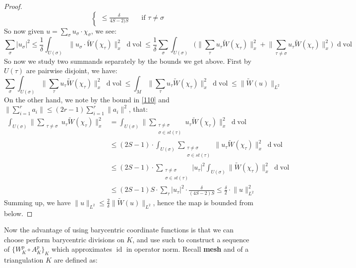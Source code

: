 \documentclass[11pt]{report}
\theoremstyle{definition}
\theoremstyle{plain}
\DeclareMathOperator{\id}{id}
\DeclareMathOperator{\vol}{vol}
\newcommand{\norm}[1]{\lVert #1 \rVert}
\renewcommand{\tilde}{\widetilde}
\newcommand{\mass}[1]{\mathop{}\mathrm{d}{#1}}
\begin{document}
\begin{proof}
\begin{equation}
\begin{cases}
\leq \frac{\delta}{4S-2)S}\quad  &\text{if }\tau\neq \sigma
\end{cases}
\end{equation}
So now given $u=\sum_{\sigma}^{}u_\sigma\cdot \chi_{\sigma}$, we see:
\begin{equation*}
\sum_{\sigma}^{}|u_\sigma|^2\leq \frac{1}{\delta}\int_{U(\sigma)}\norm{u_\sigma\cdot \tilde{W}(\chi_\tau)}_x^2\mass{\vol}\leq\frac{1}{\delta}\sum_{\sigma}^{}\int_{U(\sigma)}\Big(\norm{\sum_{\tau}u_\tau \tilde{W}(\chi_{\tau})}_x^2+\norm{\sum_{\tau\neq \sigma}^{}u_\tau \tilde{W}(\chi_{\tau})}_x^2\Big)\mass{\vol}
\end{equation*}
So now we study two summands separately by the bounds we get above. First by $U(\tau)$ are pairwise disjoint, we have:
\begin{equation*}
\sum_{\sigma}^{}\int_{U(\sigma)}\norm{\sum_{\tau}u_\tau \tilde{W}(\chi_{\tau})}_x^2\mass{\vol}\leq \int_M\norm{\sum_{\tau}u_\tau \tilde{W}(\chi_{\tau})}^2_x\mass{\vol}\leq \norm{\tilde{W}(u)}_{L^2}
\end{equation*}
On the other hand, we note by the bound in \ref{110} and $\norm{\sum_{i=1}^ra_i}\leq (2r-1)\sum_{i=1}^r\norm{a_i}^2$, that:
\begin{equation*}
\begin{split}
\int_{U(\sigma)}\norm{\sum_{\substack{\tau\neq \sigma}}u_\tau \tilde{W}(\chi_{\tau})}_x^2&=\int_{U(\sigma)}\norm{\sum_{\substack{\tau\neq \sigma\\ \sigma\in st(\tau)}}u_\tau \tilde{W}(\chi_{\tau})}_x^2\mass{\vol}\\
&\leq (2S-1)\cdot\int_{U(\sigma)}\sum_{\substack{\tau\neq \sigma\\ \sigma\in st(\tau)}}\norm{u_\tau \tilde{W}(\chi_{\tau})}_x^2\mass{\vol}\\
&\leq (2S-1)\cdot \sum_{\substack{\tau\neq \sigma\\ \sigma\in st(\tau)}}|u_\tau|^2\int_{U(\sigma)}\norm{\tilde{W}(\chi_{\tau})}_x^2\mass{\vol}\\
&\leq (2S-1)S\cdot \sum_{\tau}|u_\tau|^2\cdot\frac{\delta}{(4S-2)S}\leq \frac{\delta}{2}\cdot\norm{u}^2_{L^2}
\end{split}
\end{equation*}
Summing up, we have $\norm{u}_{L^2}\leq \frac{2}{\delta}\norm{\tilde{W}(u)}_{L^2}$, hence the map is bounded from below.
\end{proof}
Now the advantage of using barycentric coordinate functions is that we can choose perform barycentric divisions on $K$, and use such to construct a sequence of $\{W^p_K\circ A^p_K\}_K$ which approximates $\id$ in operator norm. Recall \textbf{mesh} and  of a triangulation $K$ are defined as:
\end{document}
